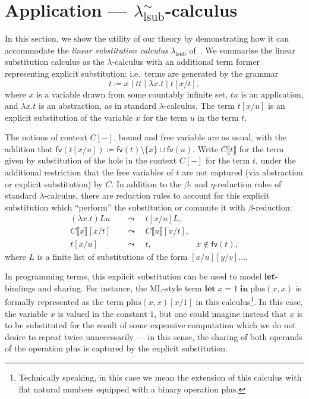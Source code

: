 \section{Application --- $\lambda^\sim_{\text{lsub}}$-calculus}

In this section, we show the utility of our theory by demonstrating how it can accommodate the \emph{linear substitution calculus} $\lambda_{\text{lsub}}$ of~\citet[§ 2]{accattoli2014nonstandard}.
We summarise the linear substitution calculus as the $\lambda$-calculus with an additional term former representing explicit substitution; i.e.\ terms are generated by the grammar
\[
	t \coloneqq x \mid t t \mid \lambda x. t \mid t [x/t],
\]
where $x$ is a variable drawn from some countably infinite set, $t u$ is an application, and $\lambda x. t$ is an abstraction, as in standard $\lambda$-calculus.
The term $t [x / u]$ is an explicit substitution of the variable $x$ for the term $u$ in the term $t$.

The notions of context $C[-]$, bound and free variable are as usual, with the addition that $\textsf{fv} (t [x/u]) \coloneq \textsf{fv} (t) \setminus \{ x \} \cup \textsf{fv} (u)$.
Write $C \llbracket t \rrbracket$ for the term given by substitution of the hole in the context $C[-]$ for the term $t$, under the additional restriction that the free variables of $t$ are not captured (via abstraction or explicit substitution) by $C$.
In addition to the $\beta$- and $\eta$-reduction rules of standard $\lambda$-calculus, there are reduction rules to account for this explicit substitution which \enquote{perform} the substitution or commute it with $\beta$-reduction:
\begin{align*}
	(\lambda x. t) L u              \quad & \leadsto \quad t[x/u] L,                                                    \\
	C \llbracket x \rrbracket [x/t] \quad & \leadsto \quad C \llbracket u \rrbracket [x/t],                             \\
	t [x/u]                         \quad & \leadsto \quad t,                               & x \notin \textsf{fv} (t),
\end{align*}
where $L$ is a finite list of substitutions of the form $[x/u] [y/v] \ldots$.

In programming terms, this explicit substitution can be used to model \textbf{let}-bindings and sharing.
For instance, the ML-style term $\textbf{let} \; x = 1 \; \textbf{in} \; \text{plus} (x, x)$ is formally represented as the term $\text{plus} (x, x) [x / 1]$ in this calculus\footnote{Technically speaking, in this case we mean the extension of this calculus with flat natural numbers equipped with a binary operation $\text{plus}$.}.
In this case, the variable $x$ is valued in the constant $1$, but one could imagine instead that $x$ is to be substituted for the result of some expensive computation which we do not desire to repeat twice unnecessarily --- in this sense, the sharing of both operands of the operation $\text{plus}$ is captured by the explicit substitution.

